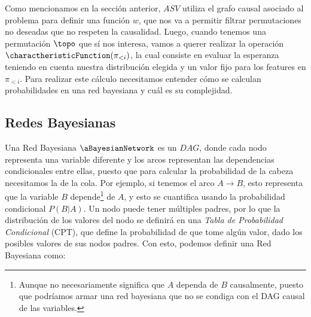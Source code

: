 Como mencionamos en la sección anterior, $ASV$ utiliza el grafo causal asociado al problema para definir una función $w$, que nos va a permitir filtrar permutaciones no deseadas que no respeten la causalidad. Luego, cuando tenemos una permutación $\topo$ que sí nos interesa, vamos a querer realizar la operación $\charactheristicFunction(\pi_{<i})$, la cual consiste en evaluar la esperanza teniendo en cuenta nuestra distribución elegida y un valor fijo para los features en $\pi_{<i}$. Para realizar este cálculo necesitamos entender cómo se calculan probabilidades en una red bayesiana y cuál es su complejidad. 

\subsection{Redes Bayesianas}
Una Red Bayesiana $\aBayesianNetwork$ es un $DAG$, donde cada nodo representa una variable diferente y los arcos representan las dependencias condicionales entre ellas, puesto que para calcular la probabilidad de la cabeza necesitamos la de la cola. Por ejemplo, si tenemos el arco $A \longrightarrow B$, esto representa que la variable $B$ depende\footnote{Aunque no necesariamente significa que $A$ dependa de $B$ causalmente, puesto que podríamos armar una red bayesiana que no se condiga con el DAG causal de las variables. } de $A$, y esto se cuantifica usando la probabilidad condicional $P(B|A)$. Un nodo puede tener múltiples padres, por lo que la distribución de los valores del nodo se definirá en una \emph{Tabla de Probabilidad Condicional} (CPT), que define la probabilidad de que tome algún valor, dado los posibles valores de sus nodos padres. Con esto, podemos definir una Red Bayesiana como:

